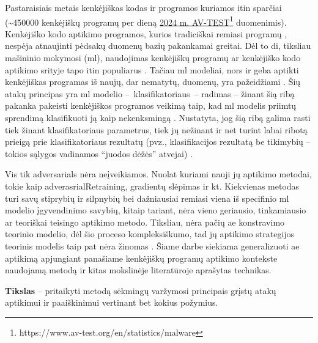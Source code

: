 
Pastaraisiais metais kenkėjiškas kodas ir programos kuriamos itin sparčiai (\sim450000 kenkėjiškų programų per dieną \href{https://www.av-test.org/en/statistics/malware/}{2024 m. AV-TEST}\footnote{https://www.av-test.org/en/statistics/malware} duomenimis). Kenkėjiško kodo aptikimo programos, kurios tradiciškai remiasi programų , nespėja atnaujinti pėdsakų duomenų bazių pakankamai greitai. Dėl to \gls{di}, tiksliau mašininio mokymosi (\gls{ml}), naudojimas kenkėjiškų programų ar kenkėjiško kodo aptikimo srityje tapo itin populiarus \cite{demetrioAdversarialEXEmplesSurvey2021}. Tačiau \gls{ml} modeliai, nors ir geba aptikti kenkėjiškas programas iš naujų, dar nematytų, duomenų, yra pažeidžiami  \cite{castroAIMEDEvolvingMalware2019,huGeneratingAdversarialMalware2017,rosenbergGenericBlackBoxEndEnd2018,zhongReinforcementLearningBased2022}. Šių atakų principas yra \gls{ml} modelio --~klasifikatoriaus~--  radimas -- žinant šią ribą pakanka pakeisti kenkėjiškos programos veikimą taip, kad \gls{ml} modelis priimtų sprendimą klasifikuoti ją kaip nekenksmingą \cite{demetrioAdversarialEXEmplesSurvey2021}. Nustatyta, jog šią ribą galima rasti tiek žinant klasifikatoriaus parametrus, tiek jų nežinant ir net turint labai ribotą prieigą prie klasifikatoriaus rezultatų (pvz., klasifikacijos rezultatą be tikimybių -- tokios sąlygos vadinamos \enquote{juodos dėžės} atvejai) \cite{fangEvadingMalwareEngines2019}.

Vis tik \glspl{adversarial} nėra neįveikiamos. Nuolat kuriami nauji jų aptikimo metodai, tokie kaip \gls{adverasrialRetraining}, gradientų slėpimas ir kt. Kiekvienas metodas turi savų stiprybių ir silpnybių bei dažniausiai remiasi viena iš specifinio \gls{ml} modelio įgyvendinimo savybių, kitaip tariant, nėra vieno geriausio, tinkamiausio ar teoriškai teisingo  aptikimo metodo. 
Tiksliau, nėra pačių \gls{ae} konstravimo teorinio modelio, dėl šio proceso kompleksiškumo, tad jų aptikimo strategijos teorinis modelis taip pat nėra žinomas \cite{chakrabortySurveyAdversarialAttacks2021}. Šiame darbe siekiama generalizuoti \gls{ae} aptikimą apjungiant panašiame kenkėjiškų programų aptikimo kontekste naudojamą \LIME \cite{ribeiroWhyShouldTrust2016} metodą ir kitas mokslinėje literatūroje aprašytas technikas.

\vspace{10pt}
\textbf{Tikslas} -- pritaikyti \LIME metodą sėkmingų varžymosi principais grįstų atakų aptikimui ir paaiškinimui vertinant bet kokius požymius.

